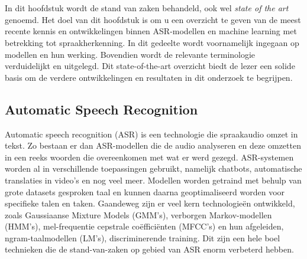 \chapter{}%
\label{ch:stand-van-zaken}



In dit hoofdstuk wordt de stand van zaken behandeld, ook wel \emph{state of the art} genoemd. Het doel van dit hoofdstuk is om u een overzicht te geven van de meest recente kennis en ontwikkelingen binnen ASR-modellen en machine learning met betrekking tot spraakherkenning. In dit gedeelte wordt voornamelijk ingegaan op modellen en hun werking. Bovendien wordt de relevante terminologie verduidelijkt en uitgelegd. Dit state-of-the-art overzicht biedt de lezer een solide basis om de verdere ontwikkelingen en resultaten in dit onderzoek te begrijpen.
\section{Automatic Speech Recognition}
Automatic speech recognition (ASR) is een technologie die spraakaudio omzet in tekst. Zo bestaan er dan ASR-modellen die de audio analyseren en deze omzetten in een reeks woorden die overeenkomen met wat er werd gezegd. ASR-systemen worden al in verschillende toepassingen gebruikt, namelijk chatbots, automatische translaties in video's en nog veel meer.\autocite{Microsoft2017} Modellen worden getraind met behulp van grote datasets gesproken taal en kunnen daarna geoptimaliseerd worden voor specifieke talen en taken. Gaandeweg zijn er veel kern technologieën ontwikkeld, zoals Gaussiaanse Mixture Models (GMM's), verborgen Markov-modellen (HMM's), mel-frequentie cepstrale coëfficiënten (MFCC's) en hun afgeleiden, ngram-taalmodellen (LM's), discriminerende training. Dit zijn een hele boel technieken die de stand-van-zaken op gebied van ASR enorm verbeterd hebben.\autocite{Mahesha2016}

